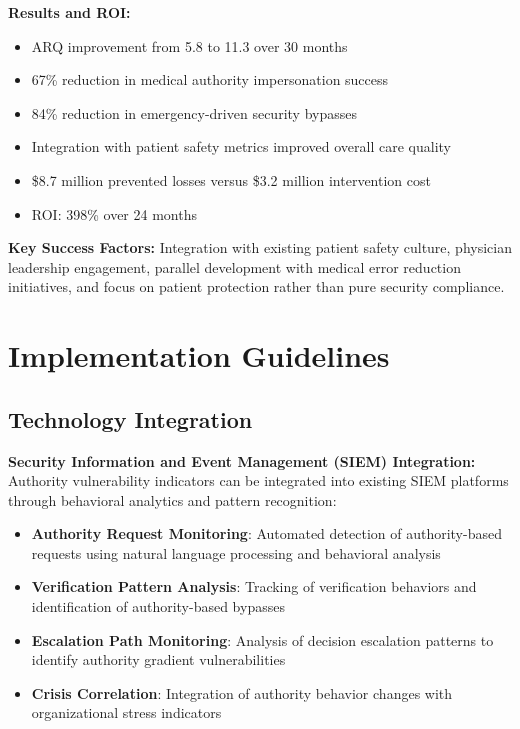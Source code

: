 \documentclass[11pt,a4paper]{article}
\begin{document}
\textbf{Results and ROI:}
\begin{itemize}
\item ARQ improvement from 5.8 to 11.3 over 30 months
\item 67\% reduction in medical authority impersonation success
\item 84\% reduction in emergency-driven security bypasses
\item Integration with patient safety metrics improved overall care quality
\item \$8.7 million prevented losses versus \$3.2 million intervention cost
\item ROI: 398\% over 24 months
\end{itemize}

\textbf{Key Success Factors:}
Integration with existing patient safety culture, physician leadership engagement, parallel development with medical error reduction initiatives, and focus on patient protection rather than pure security compliance.

\section{Implementation Guidelines}

\subsection{Technology Integration}

\textbf{Security Information and Event Management (SIEM) Integration:}
Authority vulnerability indicators can be integrated into existing SIEM platforms through behavioral analytics and pattern recognition:

\begin{itemize}
\item \textbf{Authority Request Monitoring}: Automated detection of authority-based requests using natural language processing and behavioral analysis
\item \textbf{Verification Pattern Analysis}: Tracking of verification behaviors and identification of authority-based bypasses
\item \textbf{Escalation Path Monitoring}: Analysis of decision escalation patterns to identify authority gradient vulnerabilities
\item \textbf{Crisis Correlation}: Integration of authority behavior changes with organizational stress indicators
\end{itemize}
\end{document}
